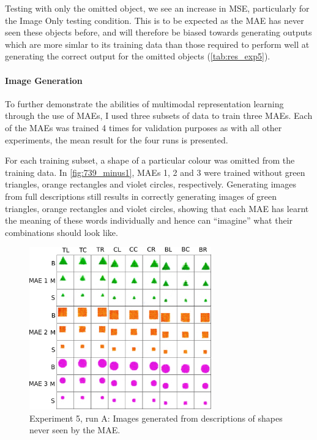 Testing with only the omitted object, we see an increase in \ac{MSE}, particularly for the Image Only testing condition. This is to be expected as the MAE has never seen these objects before, and will therefore be biased towards generating outputs which are more simlar to its training data than those required to perform well at generating the correct output for the omitted objects (\autoref{tab:res_exp5}).


\paragraph{Image Generation}
To further demonstrate the abilities of multimodal representation learning through the use of \acp{MAE}, I used three subsets of data to train three \acp{MAE}. Each of the MAEs was trained 4 times for validation purposes as with all other experiments, the mean result for the four runs is presented.

For each training subset, a shape of a particular colour was omitted from the training data. In \autoref{fig:739_minus1}, \acp{MAE} 1, 2 and 3 were trained without green triangles, orange rectangles and violet circles, respectively. Generating images from full descriptions still results in correctly generating images of green triangles, orange rectangles and violet circles, showing that each \ac{MAE} has learnt the meaning of these words individually and hence can ``imagine'' what their combinations should look like. 

\begin{figure}[h]
\centering
\includegraphics[width=0.7\textwidth]{Figs/shapes/739_minus1.png}
\caption{Experiment 5, run A: Images generated from descriptions of shapes never seen by the \ac{MAE}.}
\label{fig:739_minus1}
\end{figure}

